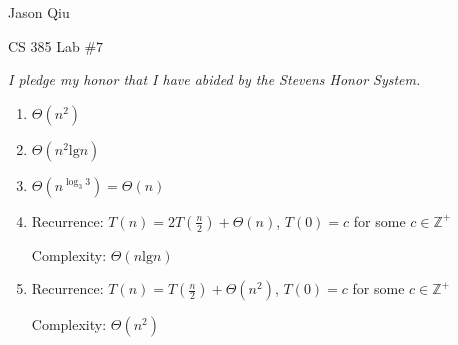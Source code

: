 \documentclass[a4paper,10pt]{article}
\begin{document}
Jason Qiu

CS 385 Lab $\#7$

\emph{I pledge my honor that I have abided by the Stevens Honor System.}

\begin{enumerate}[1.]
\item $\Theta (n^2)$
\item $\Theta (n^2 \text{lg} n)$
\item $\Theta (n^{\log_3{3}}) = \Theta (n)$
\item Recurrence: $T(n) = 2T(\frac{n}{2}) + \Theta(n)$, $T(0) = c$ for some $c \in \mathbb{Z}^+$

Complexity: $\Theta (n \text{lg} n)$

\item Recurrence: $T(n) = T(\frac{n}{2}) + \Theta(n^2)$, $T(0) = c$ for some $c \in \mathbb{Z}^+$

Complexity: $\Theta (n^2)$
\end{enumerate}
\end{document}
